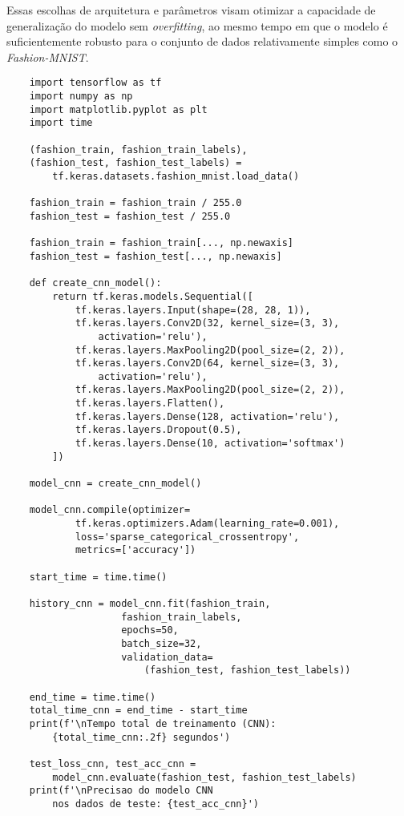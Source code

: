 Essas escolhas de arquitetura e parâmetros visam otimizar a capacidade de generalização do modelo sem \textit{overfitting}, ao mesmo tempo em que o modelo é suficientemente robusto para o conjunto de dados relativamente simples como o \textit{Fashion-MNIST}.

\begin{lstlisting}
    import tensorflow as tf
    import numpy as np
    import matplotlib.pyplot as plt
    import time

    (fashion_train, fashion_train_labels),
    (fashion_test, fashion_test_labels) = 
        tf.keras.datasets.fashion_mnist.load_data()

    fashion_train = fashion_train / 255.0
    fashion_test = fashion_test / 255.0

    fashion_train = fashion_train[..., np.newaxis]
    fashion_test = fashion_test[..., np.newaxis]

    def create_cnn_model():
        return tf.keras.models.Sequential([
            tf.keras.layers.Input(shape=(28, 28, 1)),
            tf.keras.layers.Conv2D(32, kernel_size=(3, 3), 
                activation='relu'),
            tf.keras.layers.MaxPooling2D(pool_size=(2, 2)),
            tf.keras.layers.Conv2D(64, kernel_size=(3, 3), 
                activation='relu'),
            tf.keras.layers.MaxPooling2D(pool_size=(2, 2)),
            tf.keras.layers.Flatten(),
            tf.keras.layers.Dense(128, activation='relu'),
            tf.keras.layers.Dropout(0.5),
            tf.keras.layers.Dense(10, activation='softmax')
        ])

    model_cnn = create_cnn_model()

    model_cnn.compile(optimizer=
            tf.keras.optimizers.Adam(learning_rate=0.001),
            loss='sparse_categorical_crossentropy',
            metrics=['accuracy'])

    start_time = time.time()

    history_cnn = model_cnn.fit(fashion_train, 
                    fashion_train_labels,
                    epochs=50,  
                    batch_size=32,
                    validation_data=
                        (fashion_test, fashion_test_labels))

    end_time = time.time()
    total_time_cnn = end_time - start_time
    print(f'\nTempo total de treinamento (CNN): 
        {total_time_cnn:.2f} segundos')

    test_loss_cnn, test_acc_cnn = 
        model_cnn.evaluate(fashion_test, fashion_test_labels)
    print(f'\nPrecisao do modelo CNN 
        nos dados de teste: {test_acc_cnn}')


\end{lstlisting}
